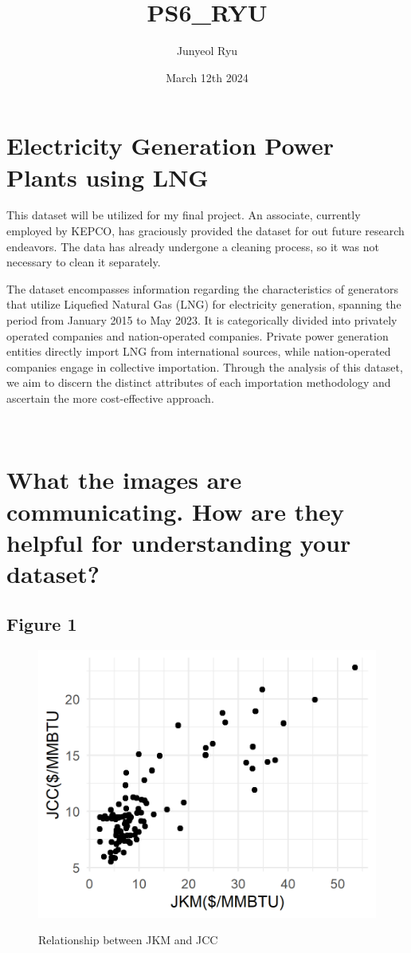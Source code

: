 \documentclass{article}
\title{PS6\_RYU}
\author{Junyeol Ryu}
\date{March 12th 2024}
\begin{document}
\maketitle

\section{Electricity Generation Power Plants using LNG}
\large{This dataset will be utilized for my final project. An associate, currently employed by KEPCO, has graciously provided the dataset for out future research endeavors. The data has already undergone a cleaning process, so it was not necessary to clean it separately.

The dataset encompasses information regarding the characteristics of generators that utilize Liquefied Natural Gas (LNG) for electricity generation, spanning the period from January 2015 to May 2023. It is categorically divided into privately operated companies and nation-operated companies. Private power generation entities directly import LNG from international sources, while nation-operated companies engage in collective importation. Through the analysis of this dataset, we aim to discern the distinct attributes of each importation methodology and ascertain the more cost-effective approach.}
\\


\section{What the images are communicating.
How are they helpful for understanding your dataset?}

\subsection{Figure 1}

\begin{figure}[t]
    \centering
            \caption{Relationship between JKM and JCC}
        \includegraphics[width=0.5\linewidth]{Figure1.png}
        \label{fig:88mono}
\end{figure}
\end{document}

